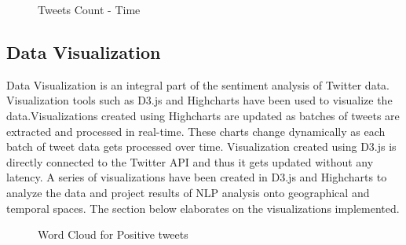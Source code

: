 \documentclass[9pt,twocolumn,twoside]{styles/osajnl}
\begin{document}
\begin{figure}[htbp]
    \centering
    \caption{Tweets Count - Time}
    \label{fig:tweetsenti}
    \end{figure}
\subsection{Data Visualization}
Data Visualization is an integral part of the sentiment analysis of Twitter data. Visualization tools such as D3.js and Highcharts \cite{www-Highcharts} have been used to visualize the data.Visualizations created using Highcharts are updated as batches of tweets are extracted and processed in real-time. These charts change dynamically as each batch of tweet data gets processed over time. Visualization created using D3.js is directly connected to the Twitter API and thus it gets updated without any latency. A series of visualizations have been created in D3.js and Highcharts to analyze the data and project results of NLP analysis onto geographical and temporal spaces. The section below elaborates on the visualizations implemented.
    \begin{figure}[htbp]
    \centering
    \caption{Word Cloud for Positive tweets}
    \label{fig:poswordcloud}
    \end{figure}
\end{document}
